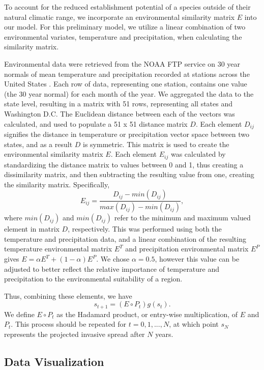 \documentclass[12pt]{article}
\begin{document}
To account for the reduced establishment potential of a species outside of their natural climatic range, we incorporate an environmental similarity matrix $E$ into our model. For this preliminary model, we utilize a linear combination of two environmental variates, temperature and precipitation, when calculating the similarity matrix.

Environmental data were retrieved from the NOAA FTP service on 30 year normals of mean temperature and precipitation recorded at stations across the United States \citep{NOAA}. Each row of data, representing one station, contains one value (the 30 year normal) for each month of the year. We aggregated the data to the state level, resulting in a matrix with 51 rows, representing all states and Washington D.C. The Euclidean distance between each of the vectors was calculated, and used to populate a 51 x 51 distance matrix $D$. Each element $D_{ij}$ signifies the distance in temperature or precipitation vector space between two states, and as a result $D$ is symmetric. This matrix is used to create the environmental similarity matrix $E$. Each element $E_{ij}$ was calculated by standardizing the distance matrix to values between 0 and 1, thus creating a dissimilarity matrix, and then subtracting the resulting value from one, creating the similarity matrix. Specifically,
\[
   E_{ij} = \frac{D_{ij} - min\left(D_{ij}\right)}{max\left(D_{ij}\right) - min\left(D_{ij}\right)},
\]
where $min(D_{ij})$ and $min(D_{ij})$ refer to the minimum and maximum valued element in matrix $D$, respectively.  This was performed using both the temperature and precipitation data, and a linear combination of the resulting temperature environmental matrix $E^{T}$ and precipitation environmental matrix $E^{P}$ gives $E = \alpha E^{T} + (1-\alpha) E^{P}$.  We chose $\alpha = 0.5$, however this value can be adjusted to better reflect the relative importance of temperature and precipitation to the environmental suitability of a region.

Thus, combining these elements, we have
\[
	s_{t+1} = (E  \circ P_t) g(s_t).
\]
We define $E \circ P_t$ as the Hadamard product, or entry-wise multiplication, of $E$ and $P_t$.  This process should be repeated for $t=0,1,...,N$, at which point $s_N$ represents the projected invasive spread after $N$ years. 


\subsection*{Data Visualization}
\end{document}
